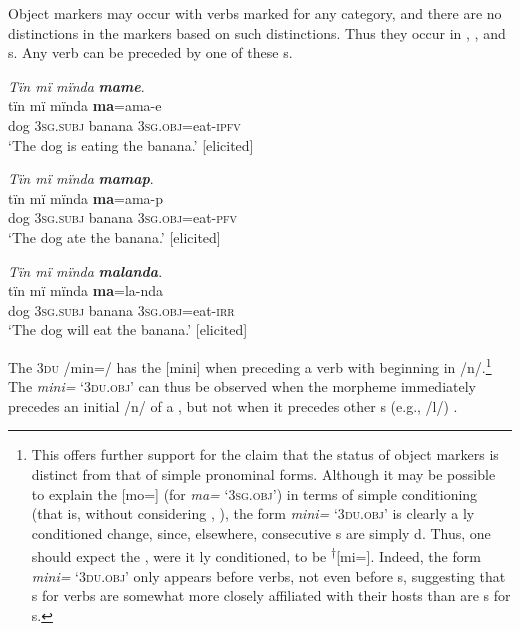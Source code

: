   Object markers may occur with verbs marked for any  category, and there are no distinctions in the markers based on such  distinctions. Thus they occur in  ,  , and   s. Any  verb can be preceded by one of these  s.

\ea%
    \label{ex:det:40}
          \textit{Tïn mï mïnda} \textbf{\textit{mame}}.\\
\gll tïn    mï      mïnda  \textbf{ma}=ama-e\\
    dog  3\textsc{sg.subj}  banana  3\textsc{sg.obj}=eat-\textsc{ipfv}\\
\glt `The dog is eating the banana.’ [elicited]
\z

\ea%
    \label{ex:det:41}
          \textit{Tïn mï mïnda} \textbf{\textit{mamap}}.\\
\gll tïn    mï      mïnda    \textbf{ma}=ama-p\\
    dog  3\textsc{sg.subj}  banana    3\textsc{sg.obj}=eat-\textsc{pfv}\\
\glt `The dog ate the banana.’ [elicited]
\z

\ea%
    \label{ex:det:42}
          \textit{Tïn mï mïnda} \textbf{\textit{malanda}}.\\
\gll tïn    mï      mïnda  \textbf{ma}=la-nda\\
    dog  3\textsc{sg.subj}  banana  3\textsc{sg.obj}=eat-\textsc{irr}\\
\glt `The dog will eat the banana.’ [elicited]
\z

   The 3\textsc{du}  /min=/ has the  [mini] when preceding a verb with  beginning in /n/.\footnote{This  offers further support for the claim that the status of object markers is distinct from that of simple pronominal forms.
   Although it may be possible to explain the  [mo=] (for \textit{ma=} ‘3\textsc{sg.obj’)} in terms of simple  conditioning (that is, without considering , ), the form \textit{mini=} ‘3\textsc{du.obj’} is clearly a ly conditioned change, since, elsewhere, consecutive s are simply d. Thus, one should expect the , were it ly conditioned, to be \textsuperscript{†}[mi=]. Indeed, the form \textit{mini=} ‘3\textsc{du.obj’} only appears before verbs, not even before s, suggesting that  s for verbs are somewhat more closely affiliated with their hosts than are  s for s.} The  \textit{mini=} ‘3\textsc{du.obj’} can thus be observed when the morpheme immediately precedes an initial /n/ of a  , but not when it precedes other s (e.g., /l/) .

